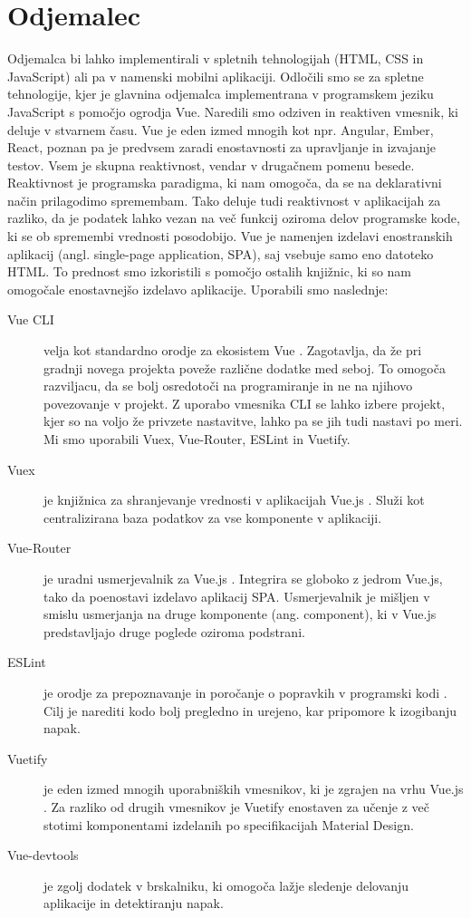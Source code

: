 \documentclass[a4paper, 12pt]{book}
\begin{document}
\section{Odjemalec}

Odjemalca bi lahko implementirali v spletnih tehnologijah (HTML, CSS in JavaScript) ali pa v namenski mobilni aplikaciji. Odločili smo se za spletne tehnologije, kjer je glavnina odjemalca implementrana v programskem jeziku JavaScript s pomočjo ogrodja Vue.  Naredili smo odziven in reaktiven vmesnik, ki deluje v stvarnem času. Vue je eden izmed mnogih kot npr. Angular, Ember, React, poznan pa je predvsem zaradi enostavnosti za upravljanje in izvajanje testov. Vsem je skupna reaktivnost, vendar v drugačnem pomenu besede. Reaktivnost \cite{reaktivnost} je programska paradigma, ki nam omogoča, da se na deklarativni način prilagodimo spremembam. Tako deluje tudi reaktivnost v aplikacijah za razliko, da je podatek lahko vezan na več funkcij oziroma delov programske kode, ki se ob spremembi vrednosti posodobijo. Vue je namenjen izdelavi enostranskih aplikacij (angl. single-page application, SPA), saj vsebuje samo eno datoteko HTML. To prednost smo izkoristili s pomočjo ostalih knjižnic, ki so nam omogočale enostavnejšo izdelavo aplikacije. Uporabili smo naslednje:
\begin{description}
\item[Vue CLI] velja kot standardno orodje za ekosistem Vue \cite{VueCLI}. Zagotavlja, da že pri gradnji novega projekta poveže različne dodatke med seboj. To omogoča razviljacu, da se bolj osredotoči na programiranje in ne na njihovo povezovanje v projekt. Z uporabo vmesnika CLI se lahko izbere projekt, kjer so na voljo že privzete nastavitve, lahko pa se jih tudi nastavi po meri. Mi smo uporabili Vuex, Vue-Router, ESLint in Vuetify.
\item[Vuex] je knjižnica za shranjevanje vrednosti v aplikacijah Vue.js \cite{Vuex}. Služi kot centralizirana baza podatkov za vse komponente v aplikaciji. 
\item[Vue-Router] je uradni usmerjevalnik za Vue.js \cite{VueRouter}. Integrira se globoko z jedrom Vue.js, tako da poenostavi izdelavo aplikacij SPA. Usmerjevalnik je mišljen v smislu usmerjanja na druge komponente (ang. component), ki v Vue.js predstavljajo druge poglede oziroma podstrani.
\item[ESLint] je orodje za prepoznavanje in poročanje o popravkih v programski kodi \cite{ESLint}. Cilj je narediti kodo bolj pregledno in urejeno, kar pripomore k izogibanju napak.
\item[Vuetify] je eden izmed mnogih uporabniških vmesnikov, ki je zgrajen na vrhu Vue.js \cite{Vuetify}. Za razliko od drugih vmesnikov je Vuetify enostaven za učenje z več stotimi komponentami izdelanih po specifikacijah Material Design.
\item[Vue-devtools] je zgolj dodatek v brskalniku, ki omogoča lažje sledenje delovanju aplikacije in detektiranju napak. 
\end{description}
\end{document}
